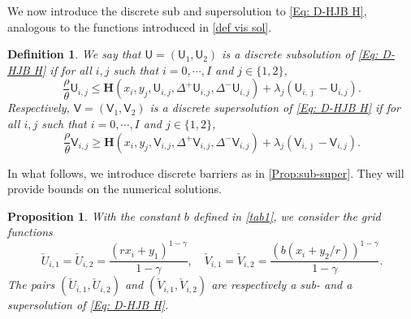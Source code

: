 \documentclass[11pt]{article}
\numberwithin{equation}{section}
\numberwithin{algorithm}{section}
\newtheorem{proposition}[proposition]{Proposition}
\newtheorem{definition}[definition]{Definition}
\newcommand{\lc}{\left(}
\newcommand{\rc}{\right)}
\newcommand{\beq}{\begin{equation}}
\newcommand{\eeq}{\end{equation}}
\theoremstyle{plain}
\newcommand{\D}{\Delta}
\begin{document}
We now introduce the discrete sub and supersolution to \cref{Eq: D-HJB H}, analogous to the functions introduced in \cref{def vis sol}. 
\begin{definition}
We say that $\mathsf{U}=(\mathsf{U}_1,\mathsf{U}_2)$ is a discrete subsolution of \cref{Eq: D-HJB H} if for all $i,j$ such that $i=0,\cdots,I$ and $j\in \{1,2\}$,
\beq\label{Ineq: sub}
\frac{\rho}{\theta} \mathsf{U}_{i,j}\leq \boldsymbol{H}\lc x_i,y_j,\mathsf{U}_{i,j},\D^+{\mathsf{U}_{i,j}},\D^-{\mathsf{U}_{i,j}}\rc+\lambda_j(\mathsf{U}_{i,\bar \jmath}-\mathsf{U}_{i,j}).
\eeq 
Respectively, $\mathsf{V}=(\mathsf{V}_1,\mathsf{V}_2)$ is a discrete supersolution of \cref{Eq: D-HJB H} if for all $i,j$ such that $i=0,\cdots,I$ and $j\in \{1,2\}$, 
\beq\label{Ineq: super}
\frac{\rho}{\theta} \mathsf{V}_{i,j}\geq \boldsymbol{H}\lc x_i,y_j,\mathsf{V}_{i,j},\D^+{\mathsf{V}_{i,j}},\D^-{\mathsf{V}_{i,j}}\rc+\lambda_j(\mathsf{V}_{i,\bar \jmath}-\mathsf{V}_{i,j}).
\eeq 
\end{definition}
In what follows, we introduce discrete barriers as in \cref{Prop:sub-super}. They will provide bounds on the numerical solutions.  
\begin{proposition}\label{Prop:sub-super disc}
With the constant $b$ defined in \cref{tab1}, we consider the grid functions
$$
\check{U}_{i,1}=\check{U}_{i,2}=\frac{(rx_i+y_1)^{1-\gamma}}{1-\gamma},\quad \check{V}_{i,1}=\check{V}_{i,2}=\frac{(b(x_i+y_2/r))^{1-\gamma}}{1-\gamma}.
$$ 
The pairs $(\check{U}_{i,1},\check{U}_{i,2})$ and $(\check{V}_{i,1},\check{V}_{i,2})$ are respectively a sub- and a supersolution of \cref{Eq: D-HJB H}.
\end{proposition}
\end{document}
